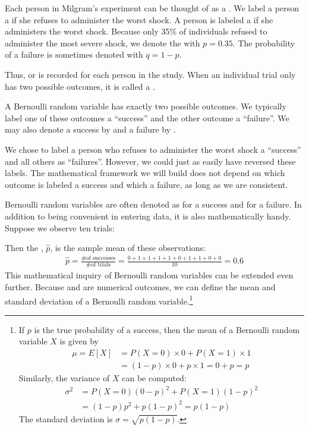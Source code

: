 Each person in Milgram's experiment can be thought of as a . We label a person a  if she refuses to administer the worst shock. A person is labeled a  if she administers the worst shock. Because only 35\% of individuals refused to administer the most severe shock, we denote the  with $p=0.35$. The probability of a failure is sometimes denoted with $q=1-p$.

Thus,  or  is recorded for each person in the study. When an individual trial only has two possible outcomes, it is called a .

\begin{termBox}{
A Bernoulli random variable has exactly two possible outcomes. We typically label one of these outcomes a ``success'' and the other outcome a ``failure''. We may also denote a success by  and a failure by .}
\end{termBox}

\begin{tipBox}{
We chose to label a person who refuses to administer the worst shock a ``success'' and all others as ``failures''. However, we could just as easily have reversed these labels. The mathematical framework we will build does not depend on which outcome is labeled a success and which a failure, as long as we are consistent.}
\end{tipBox}

Bernoulli random variables are often denoted as  for a success and  for a failure. In addition to being convenient in entering data, it is also mathematically handy. Suppose we observe ten trials:
\begin{center}
         
\end{center}
Then the , $\hat{p}$, is the sample mean of these observations:
\begin{eqnarray*}
\hat{p} = \frac{\text{\# of successes}}{\text{\# of trials}} = \frac{0+1+1+1+1+0+1+1+0+0}{10} = 0.6
\end{eqnarray*}%
This mathematical inquiry of Bernoulli random variables can be extended even further. Because  and  are numerical outcomes, we can define the {mean} and {standard deviation} of a Bernoulli random variable.\footnote{If ${p}$ is the true probability of a success, then the mean of a Bernoulli random variable $X$ is given by
\begin{align*}
\mu = E[X] &= P(X=0)\times0 + P(X=1)\times1 \\
	&= (1-p)\times0 + p\times 1 = 0+p = p
\end{align*}
Similarly, the variance of $X$ can be computed:
\begin{align*}
\sigma^2 &= {P(X=0)(0-p)^2 + P(X=1)(1-p)^2} \\
	&= {(1-p)p^2 + p(1-p)^2} = {p(1-p)}
\end{align*}
The standard deviation is $\sigma=\sqrt{p(1-p)}$.}

